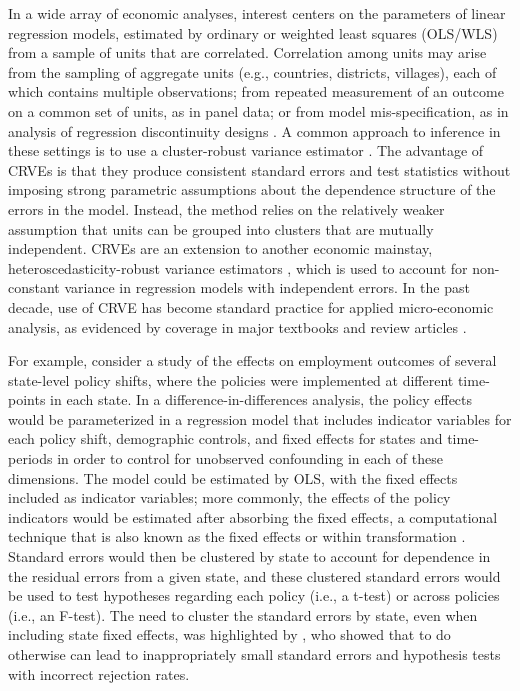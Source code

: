 \documentclass[12pt]{article}\usepackage[]{graphicx}\usepackage[]{color}
\begin{document}
In a wide array of economic analyses, interest centers on the parameters of linear regression models, estimated by ordinary or weighted least squares (OLS/WLS) from a sample of units that are correlated. 
Correlation among units may arise from the sampling of aggregate units (e.g., countries, districts, villages), each of which contains multiple observations; from repeated measurement of an outcome on a common set of units, as in panel data; or from model mis-specification, as in analysis of regression discontinuity designs \citep{Lee2008regression}. 
A common approach to inference in these settings is to use a cluster-robust variance estimator \citep[CRVE;][]{Arellano1987computing, Liang1986longitudinal, white1984asymptotic}.
The advantage of CRVEs is that they produce consistent standard errors and test statistics without imposing strong parametric assumptions about the dependence structure of the errors in the model.
Instead, the method relies on the relatively weaker assumption that units can be grouped into clusters that are mutually independent. 
CRVEs are an extension to another economic mainstay, heteroscedasticity-robust variance estimators \citep{eicker1967limit, Huber1967behavior, White1980heteroskedasticity}, which is used to account for non-constant variance in regression models with independent errors.
In the past decade, use of CRVE has become standard practice for applied micro-economic analysis, as evidenced by coverage in major textbooks and review articles \citep[e.g.,][]{Wooldridge2010econometric, Angrist2009mostly, Cameron2015practitioners}.

For example, consider a study of the effects on employment outcomes of several state-level policy shifts, where the policies were implemented at different time-points in each state. 
In a difference-in-differences analysis, the policy effects would be parameterized in a regression model that includes indicator variables for each policy shift, demographic controls, and fixed effects for states and time-periods in order to control for unobserved confounding in each of these dimensions. 
The model could be estimated by OLS, with the fixed effects included as indicator variables; more commonly, the effects of the policy indicators would be estimated after absorbing the fixed effects, a computational technique that is also known as the fixed effects or within transformation \citep{Wooldridge2010econometric}. 
Standard errors would then be clustered by state to account for dependence in the residual errors from a given state, and these clustered standard errors would be used to test hypotheses regarding each policy (i.e., a t-test) or across policies (i.e., an F-test).
The need to cluster the standard errors by state, even when including state fixed effects, was highlighted by \citet{Bertrand2004how}, who showed that to do otherwise can lead to inappropriately small standard errors and hypothesis tests with incorrect rejection rates. 
\end{document}
